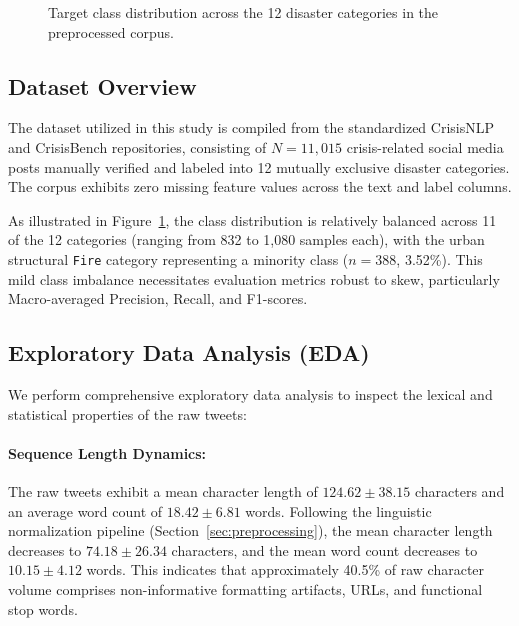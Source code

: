 \documentclass[11pt,a4paper]{article}
\begin{document}
\begin{figure}[t]
\centering
{}
\caption{Target class distribution across the 12 disaster categories in the preprocessed corpus.}
\label{fig:class_dist}
\end{figure}

\subsection{Dataset Overview}
The dataset utilized in this study is compiled from the standardized CrisisNLP and CrisisBench repositories, consisting of $N = 11,015$ crisis-related social media posts manually verified and labeled into 12 mutually exclusive disaster categories. The corpus exhibits zero missing feature values across the text and label columns.

As illustrated in Figure~\ref{fig:class_dist}, the class distribution is relatively balanced across 11 of the 12 categories (ranging from 832 to 1,080 samples each), with the urban structural \texttt{Fire} category representing a minority class ($n = 388$, 3.52\%). This mild class imbalance necessitates evaluation metrics robust to skew, particularly Macro-averaged Precision, Recall, and F1-scores.

\subsection{Exploratory Data Analysis (EDA)}
We perform comprehensive exploratory data analysis to inspect the lexical and statistical properties of the raw tweets:

\paragraph{Sequence Length Dynamics:}
The raw tweets exhibit a mean character length of $124.62 \pm 38.15$ characters and an average word count of $18.42 \pm 6.81$ words. Following the linguistic normalization pipeline (Section~\ref{sec:preprocessing}), the mean character length decreases to $74.18 \pm 26.34$ characters, and the mean word count decreases to $10.15 \pm 4.12$ words. This indicates that approximately 40.5\% of raw character volume comprises non-informative formatting artifacts, URLs, and functional stop words.
\end{document}

